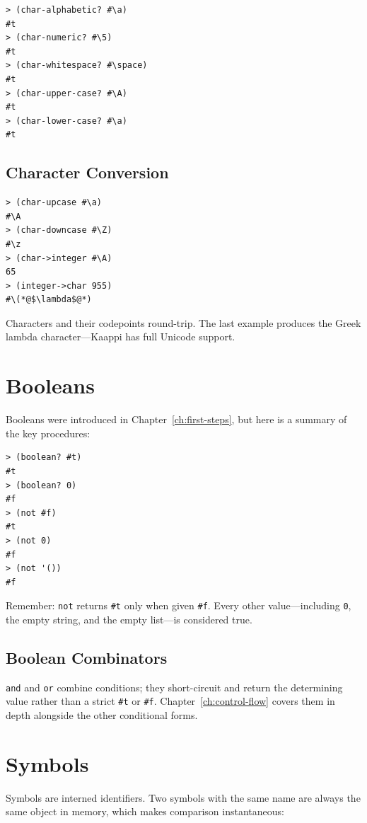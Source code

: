 \begin{lstlisting}[style=repl]
> (char-alphabetic? #\a)
#t
> (char-numeric? #\5)
#t
> (char-whitespace? #\space)
#t
> (char-upper-case? #\A)
#t
> (char-lower-case? #\a)
#t
\end{lstlisting}

\subsection{Character Conversion}

\begin{lstlisting}[style=repl]
> (char-upcase #\a)
#\A
> (char-downcase #\Z)
#\z
> (char->integer #\A)
65
> (integer->char 955)
#\(*@$\lambda$@*)
\end{lstlisting}

Characters and their codepoints round-trip. The last example produces the Greek lambda character---Kaappi has full Unicode support.

\section{Booleans}

Booleans were introduced in Chapter~\ref{ch:first-steps}, but here is a summary of the key procedures:

\begin{lstlisting}[style=repl]
> (boolean? #t)
#t
> (boolean? 0)
#f
> (not #f)
#t
> (not 0)
#f
> (not '())
#f
\end{lstlisting}

Remember: \texttt{not} returns \texttt{\#t} only when given \texttt{\#f}. Every other value---including \texttt{0}, the empty string, and the empty list---is considered true.

\subsection{Boolean Combinators}

\texttt{and} and \texttt{or} combine conditions; they short-circuit and return the determining value rather than a strict \texttt{\#t} or \texttt{\#f}. Chapter~\ref{ch:control-flow} covers them in depth alongside the other conditional forms.

\section{Symbols}

Symbols are interned identifiers. Two symbols with the same name are always the same object in memory, which makes comparison instantaneous:

